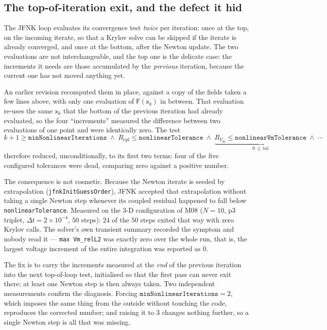 \documentclass[11pt,a4paper]{article}
\newcommand{\code}[1]{\texttt{\small #1}}
\newcommand{\Vm}{V_{\text{m}}}
\newcommand{\Fres}{\mathsf{F}}
\begin{document}
\subsection{The top-of-iteration exit, and the defect it hid}
\label{sec:jfnk-early-exit}

The JFNK loop evaluates its convergence test \emph{twice} per iteration: once at
the top, on the incoming iterate, so that a Krylov solve can be skipped if the
iterate is already converged, and once at the bottom, after the Newton update.
The two evaluations are not interchangeable, and the top one is the delicate
case: the increments it needs are those accumulated by the \emph{previous}
iteration, because the current one has not moved anything yet.

An earlier revision recomputed them in place, against a copy of the fields taken
a few lines above, with only one evaluation of $\Fres(\mathsf{x}_k)$ in between.
That evaluation re-uses the same $\mathsf{x}_k$ that the bottom of the previous
iteration had already evaluated, so the four ``increments'' measured the
difference between two evaluations of one point and were identically zero. The
test
\begin{equation*}
  k+1\ge\texttt{minNonlinearIterations}
  \;\wedge\;
  R_{\mathrm{cpl}}\le\texttt{nonlinearTolerance}
  \;\wedge\;
  \underbrace{R_{\Vm}\le\texttt{nonlinearVmTolerance}}_{0\,\le\,\text{tol}}
  \;\wedge\;\cdots
\end{equation*}
therefore reduced, unconditionally, to its first two terms: four of the five
configured tolerances were dead, comparing zero against a positive number.

The consequence is not cosmetic. Because the Newton iterate is seeded by
extrapolation (\code{jfnkInitGuessOrder}), JFNK accepted that extrapolation
without taking a single Newton step whenever its coupled residual happened to
fall below \code{nonlinearTolerance}. Measured on the 3-D configuration of M08
($N=10$, $\mathrm{p}3$ triplet, $\Delta t=2\times10^{-4}$, $50$ steps): $24$ of
the $50$ steps exited that way with zero Krylov calls. The solver's own transient
summary recorded the symptom and nobody read it --- \code{max Vm\_relL2} was
exactly zero over the whole run, that is, the largest voltage increment of the
entire integration was reported as $0$.

The fix is to carry the increments measured at the \emph{end} of the previous
iteration into the next top-of-loop test, initialised so that the first pass can
never exit there; at least one Newton step is then always taken. Two independent
measurements confirm the diagnosis. Forcing
$\texttt{minNonlinearIterations}=2$, which imposes the same thing from the
outside without touching the code, reproduces the corrected number; and raising
it to $3$ changes nothing further, so a single Newton step is all that was
missing.
\end{document}
